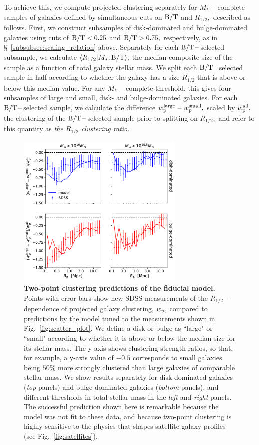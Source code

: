 \documentclass[usenatbib,usegraphicx,letterpaper]{mn2e}
\newcommand{\rhalf}{R_{1/2}}
\newcommand{\bt}{{\rm B/T}}
\newcommand{\mstar}{M_{\ast}}
\newcommand{\wproj}{w_{\rm p}}
\begin{document}
To achieve this, we compute projected clustering separately for $\mstar-$complete samples of galaxies defined by simultaneous cuts on $\bt$ and $\rhalf,$ described as follows. First, we construct subsamples of disk-dominated and bulge-dominated galaxies using cuts of $\bt<0.25$ and $\bt>0.75,$ respectively, as in \S~\ref{subsubsec:scaling_relation} above. Separately for each $\bt-$selected subsample, we calculate $\langle\rhalf\vert\mstar;\bt\rangle,$ the median composite size of the sample as a function of total galaxy stellar mass. We split each $\bt-$selected sample in half according to whether the galaxy has a size $\rhalf$ that is above or below this median value. For any $\mstar-$complete threshold, this gives four subsamples of large and small, disk- and bulge-dominated galaxies. For each $\bt-$selected sample, we calculate the difference $\wproj^{\rm large}-\wproj^{\rm small},$ scaled by $\wproj^{\rm all},$ the clustering of the $\bt-$selected sample prior to splitting on $\rhalf,$ and refer to this quantity as {\em the $\rhalf$ clustering ratio}.

\begin{figure}
\centering
\includegraphics[width=8cm]{FIGS/size_clustering_ratios_bt_decomposition_model_vs_sdss.pdf}
\caption{
{\bf Two-point clustering predictions of the fiducial model.}
Points with error bars show new SDSS measurements of the $\rhalf-$dependence of projected galaxy clustering, $\wproj,$ compared to predictions by the model tuned to the measurements shown in Fig.~\ref{fig:scatter_plot}. We define a disk or bulge as ``large" or ``small" according to whether it is above or below the median size for its stellar mass. The y-axis shows clustering strength ratios, so that, for example, a y-axis value of $-0.5$ corresponds to small galaxies being $50\%$ more strongly clustered than large galaxies of comparable stellar mass. We show results separately for disk-dominated galaxies ({\em top} panels) and bulge-dominated galaxies ({\em bottom }panels), and different thresholds in total stellar mass in the {\em left} and {\em right} panels. The successful prediction shown here is remarkable because the model was not fit to these data, and because two-point clustering is highly sensitive to the physics that shapes satellite galaxy profiles (see Fig.~\ref{fig:satellites}).
}
\label{fig:clustering_ratio_upshot}
\end{figure}
\end{document}
